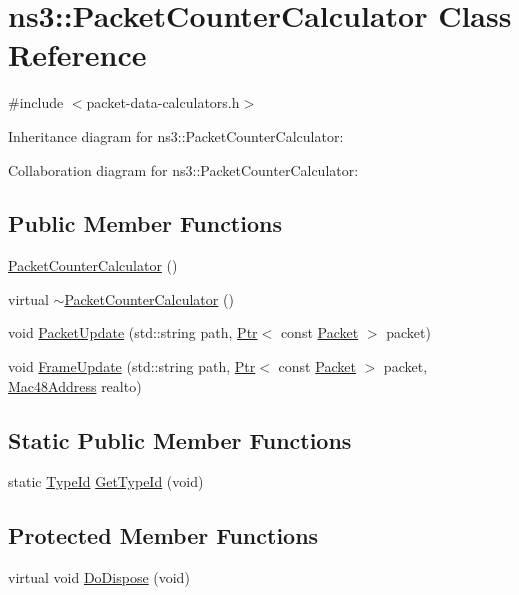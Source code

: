 \hypertarget{classns3_1_1PacketCounterCalculator}{}\section{ns3\+:\+:Packet\+Counter\+Calculator Class Reference}
\label{classns3_1_1PacketCounterCalculator}


{\ttfamily \#include $<$packet-\/data-\/calculators.\+h$>$}



Inheritance diagram for ns3\+:\+:Packet\+Counter\+Calculator\+:


Collaboration diagram for ns3\+:\+:Packet\+Counter\+Calculator\+:
\subsection*{Public Member Functions}
\begin{DoxyCompactItemize}
\item 
\hyperlink{classns3_1_1PacketCounterCalculator_ab650fc2eeffda221742ea8b74a249e36}{Packet\+Counter\+Calculator} ()
\item 
virtual \hyperlink{classns3_1_1PacketCounterCalculator_a5c736da31913afab3b3f460b77edac1f}{$\sim$\+Packet\+Counter\+Calculator} ()
\item 
void \hyperlink{classns3_1_1PacketCounterCalculator_aae3acf8583084b48cbd9791322d7c59d}{Packet\+Update} (std\+::string path, \hyperlink{classns3_1_1Ptr}{Ptr}$<$ const \hyperlink{classns3_1_1Packet}{Packet} $>$ packet)
\item 
void \hyperlink{classns3_1_1PacketCounterCalculator_a7ae51b37f0cd073da50a45b4de4c6dd4}{Frame\+Update} (std\+::string path, \hyperlink{classns3_1_1Ptr}{Ptr}$<$ const \hyperlink{classns3_1_1Packet}{Packet} $>$ packet, \hyperlink{classns3_1_1Mac48Address}{Mac48\+Address} realto)
\end{DoxyCompactItemize}
\subsection*{Static Public Member Functions}
\begin{DoxyCompactItemize}
\item 
static \hyperlink{classns3_1_1TypeId}{Type\+Id} \hyperlink{classns3_1_1PacketCounterCalculator_a1e45e364fae51601676bd4b7218449c4}{Get\+Type\+Id} (void)
\end{DoxyCompactItemize}
\subsection*{Protected Member Functions}
\begin{DoxyCompactItemize}
\item 
virtual void \hyperlink{classns3_1_1PacketCounterCalculator_a6bafe4ee2c1ab84bdf42ab7c89025afd}{Do\+Dispose} (void)
\end{DoxyCompactItemize}

